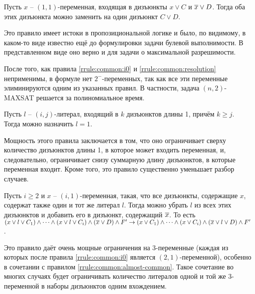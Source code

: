 \begin{rrule}
 Пусть $x$ -- $(1,1)$-переменная, входящая в дизъюнкты $x \vee C$ и $\overline{x} \vee D$. Тогда оба этих дизъюнкта можно заменить на один дизъюнкт $C \vee D$.
 \label{rrule:common:resolution}
\end{rrule}

Это правило имеет истоки в пропозициональной логике и было, по видимому, в каком-то виде известно ещё до формулировки задачи булевой выполнимости. В представленном виде оно верно и для задачи о максимальной разрешимости.

\begin{note}
 После того, как правила \ref{rrule:common:i0} и \ref{rrule:common:resolution} неприменимы, в формуле нет $2^-$-переменных, так как все эти переменные элиминируются одним из указанных правил. В частности, задача $(n,2)$-MAXSAT решается за полиномиальное время.
\end{note}

\begin{rrule}
 Пусть $l$ -- $(i,j)$-литерал, входящий в $k$ дизъюнктов длины 1, причём $k \geq j$. Тогда можно назначить $l = 1$.
 \label{rrule:common:unit-clauses}
\end{rrule}

Мощность этого правила заключается в том, что оно ограничивает сверху количество дизъюнктов длины 1, в которое может входить переменная, и, следовательно, ограничивает снизу суммарную длину дизъюнктов, в которые переменная входит. Кроме того, это правило существенно уменьшает разбор случаев.

\begin{rrule}
 Пусть $i \geq 2$ и $x$ -- $(i,1)$-переменная, такая, что все дизъюнкты, содержащие $x$, содержат также один и тот же литерал $l$. Тогда можно убрать $l$ из всех этих дизъюнктов и добавить его в дизъюнкт, содержащий $\overline{x}$. То есть $(x \vee l \vee C_1) \wedge \dots \wedge (x \vee l \vee C_i) \wedge (\overline{x} \vee D) \wedge F' \rightarrow (x \vee C_1) \wedge \dots \wedge (x \vee C_i) \wedge (\overline{x} \vee l \vee D) \wedge F'$.
 \label{rrule:common:xu19rr9}
\end{rrule}

Это правило даёт очень мощные ограничения на 3-переменные (каждая из которых после правила \ref{rrule:common:i0} является $(2,1)$-переменной), особенно в сочетании с правилом \ref{rrule:common:almost-common}. Такое сочетание во многих случаях будет ограничивать количество литералов одной и той же 3-переменной в наборы дизъюнктов одним вхождением.

